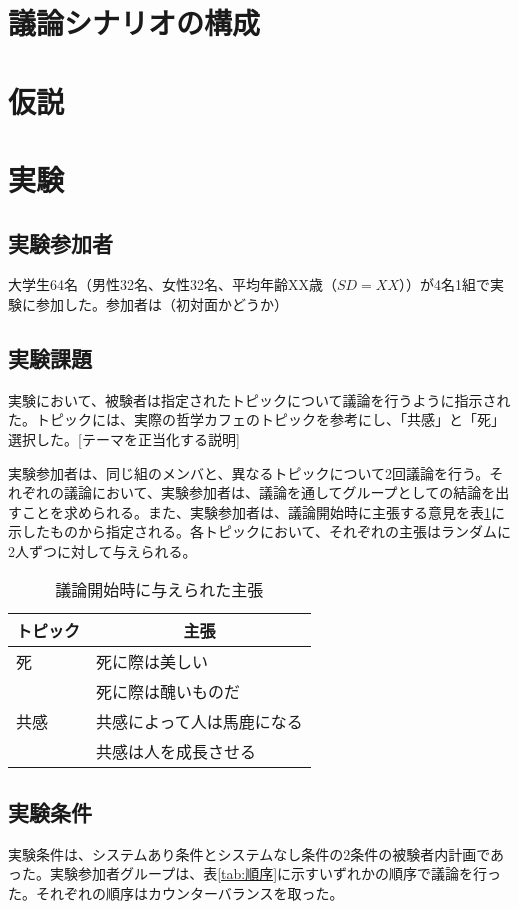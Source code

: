 \documentclass[11pt, a4paper]{jreport} %
\begin{document}
\section{議論シナリオの構成}

\section{仮説}

\section{実験}
\subsection{実験参加者}
大学生64名（男性32名、女性32名、平均年齢XX歳（$SD=XX$））が4名1組で実験に参加した。参加者は（初対面かどうか）
\subsection{実験課題}
実験において、被験者は指定されたトピックについて議論を行うように指示された。トピックには、実際の哲学カフェのトピックを参考にし、「共感」と「死」選択した。[テーマを正当化する説明]


実験参加者は、同じ組のメンバと、異なるトピックについて2回議論を行う。それぞれの議論において、実験参加者は、議論を通してグループとしての結論を出すことを求められる。また、実験参加者は、議論開始時に主張する意見を表\ref{tab:始めの意見}に示したものから指定される。各トピックにおいて、それぞれの主張はランダムに2人ずつに対して与えられる。

\begin{table}[]
\caption{議論開始時に与えられた主張}
\centering
\begin{tabular}{@{}ll@{}}
\toprule
トピック & \multicolumn{1}{c}{主張} \\ \midrule
死    & 死に際は美しい                \\
     & 死に際は醜いものだ              \\
共感   & 共感によって人は馬鹿になる          \\
     & 共感は人を成長させる             \\ \bottomrule
\end{tabular}
\label{tab:始めの意見}
\end{table}




\subsection{実験条件}
実験条件は、システムあり条件とシステムなし条件の2条件の被験者内計画であった。実験参加者グループは、表\ref{tab:順序}に示すいずれかの順序で議論を行った。それぞれの順序はカウンターバランスを取った。
\end{document}
